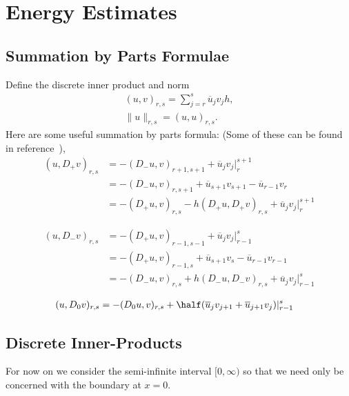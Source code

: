 \newcommand{\ubar}{\overline{u}}
\newcommand{\vbar}{\overline{v}}
\section{Energy Estimates}

\subsection{Summation by Parts Formulae}


Define the discrete inner product and norm
\begin{align}
    (u,v)_{r,s} = \sum_{j=r}^s \ubar_j v_j h ,\\
   \| u \|_{r,s} = (u,u)_{r,s} .
\end{align}
Here are some useful summation by parts formula: 
(Some of these can be found in reference~\cite{GustafssonKreissOliger95}),
\begin{align}
   (u,D_+ v)_{r,s} &= -(D_-u,v)_{r+1,s+1} + \ubar_j v_j \vert_r^{s+1}   \label{eq:dpa} \\
                   &= -(D_-u,v)_{r,s+1} + \ubar_{s+1} v_{s+1} - \ubar_{r-1} v_r \label{eq:dpb} \\
         &= -(D_+ u,v)_{r,s} - h (D_+u, D_+v)_{r,s} + \ubar_j v_j\vert_r^{s+1} \label{eq:dpc}
\end{align}

\begin{align}
   (u,D_- v)_{r,s} &= -(D_+u,v)_{r-1,s-1} + \ubar_j v_j \vert_{r-1}^{s} \label{eq:dma} \\
                   &= -(D_+u,v)_{r-1,s  } + \ubar_{s+1} v_{s} - \ubar_{r-1} v_{r-1} \label{eq:dmb} \\
         &= -(D_-u,v)_{r,s} + h (D_-u, D_-v)_{r,s} + \ubar_j v_j\vert_{r-1}^{s} \label{eq:dmc}
\end{align}

\begin{align}
   (u,D_0 v)_{r,s} &= -(D_0 u,v)_{r,s} + \half( \ubar_j v_{j+1} + \ubar_{j+1} v_j ) \vert_{r-1}^{s} \label{eq:dza}
\end{align}


\subsection{Discrete Inner-Products}

For now on we consider the semi-infinite interval $[0,\infty)$ so that we need only be concerned with
the boundary at $x=0$. 

